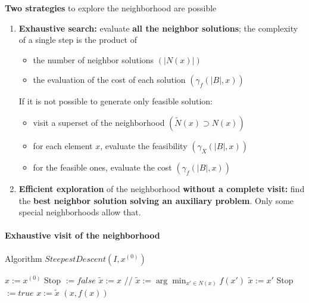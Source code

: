 \textbf{Two strategies} to explore the neighborhood are possible
\begin{enumerate}
	\item \textbf{Exhaustive search:} evaluate \textbf{all the neighbor solutions}; the complexity of a single step is the product of
	\begin{itemize}
		\item the number of neighbor solutions $(|N (x)|)$
		\item the evaluation of the cost of each solution $(\gamma_f (|B|, x))$
	\end{itemize}
	If it is not possible to generate only feasible solution:
	\begin{itemize}
		\item visit a superset of the neighborhood $( \tilde{N} (x) \supset N (x))$
		\item for each element $x$, evaluate the feasibility $(\gamma_X (|B|, x))$
		\item for the feasible ones, evaluate the cost $(\gamma_f (|B|, x))$
	\end{itemize}
	\nn
	
	\item \textbf{Efficient exploration} of the neighborhood \textbf{without a complete visit:} find the \textbf{best neighbor solution solving an auxiliary problem}. Only some special neighborhoods allow that.\\
\end{enumerate}

\newpage

\paragraph{Exhaustive visit of the neighborhood} \nn

\begin{algorithm}
	\caption{Algorithm $SteepestDescent(I , x^{(0)})$}
	\begin{algorithmic}
		\STATE $x := x^{(0)}$
		\STATE Stop $:= false$
		\STATE $ \tilde{x} := x$ // $\tilde{x} := \arg \min_{x' \in N(x)} f(x')$
		\STATE $\tilde{x} := x'$
		\ENDIF
		\ENDIF
		\ENDFOR
		\STATE Stop $ := true$
		\ELSE
		\STATE $x := \tilde{x}$
		\ENDIF
		\ENDWHILE
		\RETURN $(x, f (x))$
	\end{algorithmic}
\end{algorithm}


